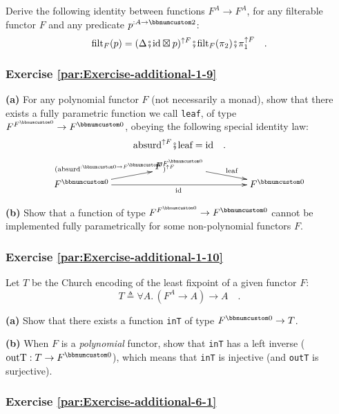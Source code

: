 Derive the following identity between functions $F^{A}\rightarrow F^{A}$,
for any filterable functor $F$ and any predicate $p^{:A\rightarrow\bbnum 2}$:
\[
\text{filt}_{F}(p)=(\Delta\bef\text{id}\boxtimes p)^{\uparrow F}\bef\text{filt}_{F}(\pi_{2})\bef\pi_{1}^{\uparrow F}\quad.
\]


\subsubsection{Exercise \label{par:Exercise-additional-1-9}\ref{par:Exercise-additional-1-9}}

\textbf{(a)} For any polynomial functor $F$ (not necessarily a monad),
show that there exists a fully parametric function we call \lstinline!leaf!,
of type $F^{F^{\bbnum 0}}\rightarrow F^{\bbnum 0}$, obeying the following
special identity law:
\[
\text{absurd}^{\uparrow F}\bef\text{leaf}=\text{id}\quad.
\]
\[
\xymatrix{\xyScaleY{0.3pc}\xyScaleX{3.5pc} & F^{F^{\bbnum 0}}\ar[rd]\sp(0.5){\ \text{leaf}}\\
F^{\bbnum 0}\ar[ru]\sp(0.5){(\text{absurd}^{:\bbnum 0\rightarrow F^{\bbnum 0}})^{\uparrow F}\ \ }\ar[rr]\sb(0.5){\text{id}\,} &  & F^{\bbnum 0}
}
\]

\textbf{(b)} Show that a function of type $F^{F^{\bbnum 0}}\rightarrow F^{\bbnum 0}$
cannot be implemented fully parametrically for some non-polynomial
functors $F$.

\subsubsection{Exercise \label{par:Exercise-additional-1-10}\ref{par:Exercise-additional-1-10}}

Let $T$ be the Church encoding of the least fixpoint of a given functor
$F$:
\[
T\triangleq\forall A.\,(F^{A}\rightarrow A)\rightarrow A\quad.
\]

\textbf{(a)} Show that there exists a function \lstinline!inT! of
type $F^{\bbnum 0}\rightarrow T$.

\textbf{(b)} When $F$ is a \emph{polynomial} functor, show that \lstinline!inT!
has a left inverse ($\text{outT}:T\rightarrow F^{\bbnum 0}$), which
means that \lstinline!inT! is injective (and \lstinline!outT! is
surjective).

\subsubsection{Exercise \label{par:Exercise-additional-6-1}\ref{par:Exercise-additional-6-1}}

